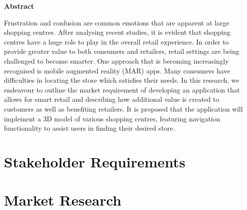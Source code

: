 \documentclass[12pt]{report}
\newcommand\blankpage{%
    \null
    \thispagestyle{empty}%
    \addtocounter{page}{-1}%
    \newpage}
\begin{document}
\begin{center}    
    \large
    \textbf{Abstract}\\
\end{center}
Frustration and confusion are common emotions that are apparent at large shopping centres. After analysing recent studies, it is evident that shopping centres have a huge role to play in the overall retail experience. In order to provide greater value to both consumers and retailers, retail settings are being challenged to become smarter. One approach that is becoming increasingly recognised is mobile augmented reality (MAR) apps. Many consumers have difficulties in locating the store which satisfies their needs. In this research, we endeavour to outline the market requirement of developing an application that allows for smart retail and describing how additional value is created to customers as well as benefiting retailers. It is proposed that the application will implement a 3D model of various shopping centres, featuring navigation functionality to assist users in finding their desired store.\\

\tableofcontents
\afterpage{\blankpage}

\chapter{Stakeholder Requirements}


\chapter{Market Research}










%
%
\end{document}
